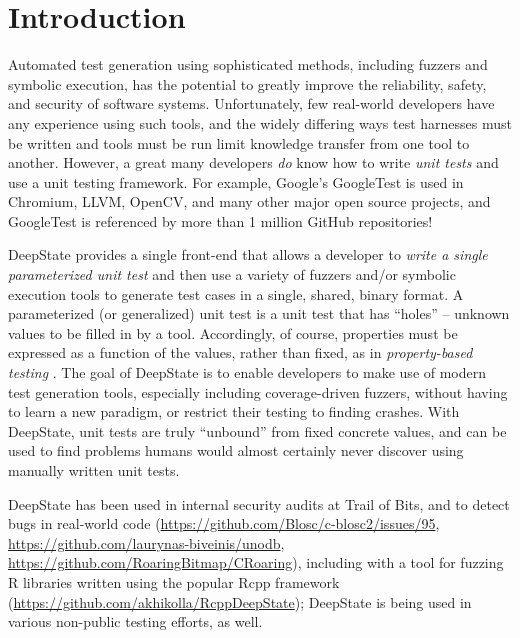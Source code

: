 \documentclass[sigconf]{acmart}
\begin{document}



\maketitle

\section{Introduction}

Automated test generation using sophisticated methods, including fuzzers and symbolic execution, has the potential to greatly improve the reliability, safety, and security of software systems.  Unfortunately, few real-world developers have any experience using such tools, and the widely differing ways test harnesses must be written \cite{WODACommon} and tools must be run limit knowledge transfer from one tool to another.  However, a great many developers \emph{do} know how to write \emph{unit tests} and use a unit testing framework.  For example, Google's GoogleTest is used in Chromium, LLVM, OpenCV, and many other major open source projects, and GoogleTest is referenced by more than 1 million GitHub repositories!

DeepState \cite{goodman2018deepstate} provides a single front-end that allows a developer to \emph{write a single parameterized unit test} \cite{ParamUnit}  and then use a variety of fuzzers and/or symbolic execution tools to generate test cases in a single, shared, binary format.  A parameterized (or generalized) unit test is a unit test that has ``holes'' -- unknown values to be filled in by a tool.  Accordingly, of course, properties must be expressed as a function of the values, rather than fixed, as in \emph{property-based testing} \cite{ClaessenH00}.  The goal of DeepState is to enable developers to make use of modern test generation tools, especially including coverage-driven fuzzers, without having to learn a new paradigm, or restrict their testing to finding crashes.  With DeepState, unit tests are truly ``unbound'' from fixed concrete values, and can be used to find problems humans would almost certainly never discover using manually written unit tests.

DeepState has been used in internal security audits at Trail of Bits, and to detect bugs in real-world code (\url{https://github.com/Blosc/c-blosc2/issues/95}, \url{https://github.com/laurynas-biveinis/unodb}, \url{https://github.com/RoaringBitmap/CRoaring}), including with a tool for fuzzing R libraries written using the popular Rcpp framework (\url{https://github.com/akhikolla/RcppDeepState}); DeepState is being used in various non-public testing efforts, as well.
\end{document}
